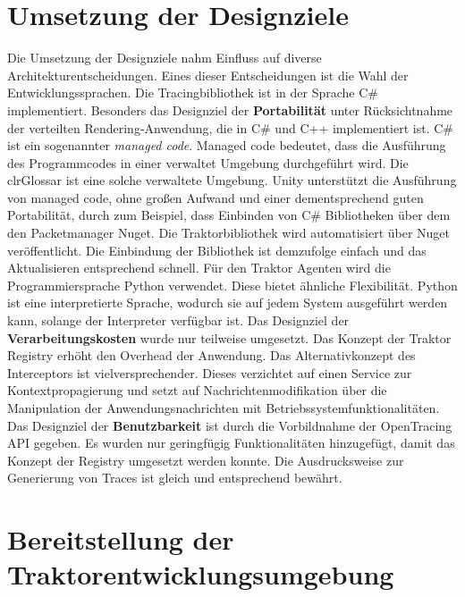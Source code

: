 \section{Umsetzung der Designziele}
\label{section:Umsetzung der Designziele}

Die Umsetzung der Designziele nahm Einfluss auf diverse Architekturentscheidungen. Eines dieser Entscheidungen ist die Wahl der Entwicklungssprachen. Die Tracingbibliothek ist in der Sprache C\# implementiert. Besonders das Designziel der \textbf{Portabilität} unter Rücksichtnahme der verteilten Rendering-Anwendung, die in C\# und C++ implementiert ist. C\# ist ein sogenannter \emph{managed code}. Managed code bedeutet, dass die Ausführung des Programmcodes in einer verwaltet Umgebung durchgeführt wird. Die \gls{clrGlossar} ist eine solche verwaltete Umgebung. Unity unterstützt die Ausführung von managed code, ohne großen Aufwand und einer dementsprechend guten Portabilität, durch zum Beispiel, dass Einbinden von C\# Bibliotheken über dem den Packetmanager Nuget. Die Traktorbibliothek wird automatisiert über Nuget veröffentlicht. Die Einbindung der Bibliothek ist demzufolge einfach und das Aktualisieren entsprechend schnell. Für den Traktor Agenten wird die Programmiersprache Python verwendet. Diese bietet ähnliche Flexibilität. Python ist eine interpretierte Sprache, wodurch sie auf jedem System ausgeführt werden kann, solange der Interpreter verfügbar ist.
Das Designziel der \textbf{Verarbeitungskosten} wurde nur teilweise umgesetzt. Das Konzept der Traktor Registry  erhöht den Overhead der Anwendung. Das Alternativkonzept des Interceptors ist vielversprechender. Dieses verzichtet auf einen Service zur Kontextpropagierung und setzt auf Nachrichtenmodifikation über die Manipulation der Anwendungsnachrichten mit Betriebssystemfunktionalitäten. Das Designziel der \textbf{Benutzbarkeit} ist durch die Vorbildnahme der OpenTracing API gegeben. Es wurden nur geringfügig Funktionalitäten hinzugefügt, damit das Konzept der Registry umgesetzt werden konnte. Die Ausdrucksweise zur Generierung von Traces ist gleich und entsprechend bewährt.



\section{Bereitstellung der Traktorentwicklungsumgebung}
\label{section:Bereitstellung der Traktorentwicklungsumgebung}


